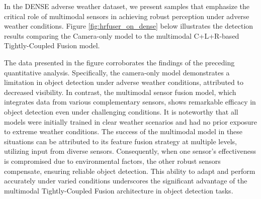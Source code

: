 \documentclass[report.tex]{subfiles}
\begin{document}
    In the DENSE adverse weather dataset, we present samples that emphasize the critical role of multimodal sensors in achieving robust perception under adverse weather conditions. Figure \ref{fig:hrfuser_on_dense} below illustrates the detection results comparing the Camera-only model to the multimodal C+L+R-based Tightly-Coupled Fusion model.

    The data presented in the figure corroborates the findings of the preceding quantitative analysis. Specifically, the camera-only model demonstrates a limitation in object detection under adverse weather conditions, attributed to decreased visibility. In contrast, the multimodal sensor fusion model, which integrates data from various complementary sensors, shows remarkable efficacy in object detection even under challenging conditions. It is noteworthy that all models were initially trained in clear weather scenarios and had no prior exposure to extreme weather conditions. The success of the multimodal model in these situations can be attributed to its feature fusion strategy at multiple levels, utilizing input from diverse sensors. Consequently, when one sensor's effectiveness is compromised due to environmental factors, the other robust sensors compensate, ensuring reliable object detection. This ability to adapt and perform accurately under varied conditions underscores the significant advantage of the multimodal Tightly-Coupled Fusion architecture in object detection tasks.
\end{document}
